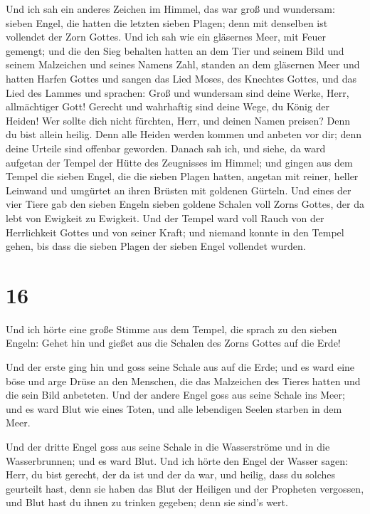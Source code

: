  Und ich sah ein anderes Zeichen im Himmel, das war groß
und wundersam: sieben Engel, die hatten die letzten sieben Plagen; denn
mit denselben ist vollendet der Zorn Gottes.  Und ich sah
wie ein gläsernes Meer, mit Feuer gemengt; und die den Sieg behalten
hatten an dem Tier und seinem Bild und seinem Malzeichen und seines
Namens Zahl, standen an dem gläsernen Meer und hatten Harfen Gottes
 und sangen das Lied Moses, des Knechtes Gottes, und das
Lied des Lammes und sprachen: Groß und wundersam sind deine Werke, Herr,
allmächtiger Gott! Gerecht und wahrhaftig sind deine Wege, du König der
Heiden!  Wer sollte dich nicht fürchten, Herr, und deinen
Namen preisen? Denn du bist allein heilig. Denn alle Heiden werden
kommen und anbeten vor dir; denn deine Urteile sind offenbar geworden.
 Danach sah ich, und siehe, da ward aufgetan der Tempel
der Hütte des Zeugnisses im Himmel;  und gingen aus dem
Tempel die sieben Engel, die die sieben Plagen hatten, angetan mit
reiner, heller Leinwand und umgürtet an ihren Brüsten mit goldenen
Gürteln.  Und eines der vier Tiere gab den sieben Engeln
sieben goldene Schalen voll Zorns Gottes, der da lebt von Ewigkeit zu
Ewigkeit.  Und der Tempel ward voll Rauch von der
Herrlichkeit Gottes und von seiner Kraft; und niemand konnte in den
Tempel gehen, bis dass die sieben Plagen der sieben Engel vollendet
wurden.

\hypertarget{section-15}{%
\section{16}\label{section-15}}

 Und ich hörte eine große Stimme aus dem Tempel, die
sprach zu den sieben Engeln: Gehet hin und gießet aus die Schalen des
Zorns Gottes auf die Erde!

 Und der erste ging hin und goss seine Schale aus auf die
Erde; und es ward eine böse und arge Drüse an den Menschen, die das
Malzeichen des Tieres hatten und die sein Bild anbeteten. 
Und der andere Engel goss aus seine Schale ins Meer; und es ward Blut
wie eines Toten, und alle lebendigen Seelen starben in dem Meer.

 Und der dritte Engel goss aus seine Schale in die
Wasserströme und in die Wasserbrunnen; und es ward Blut. 
Und ich hörte den Engel der Wasser sagen: Herr, du bist gerecht, der da
ist und der da war, und heilig, dass du solches geurteilt hast,
 denn sie haben das Blut der Heiligen und der Propheten
vergossen, und Blut hast du ihnen zu trinken gegeben; denn sie sind's
wert.

